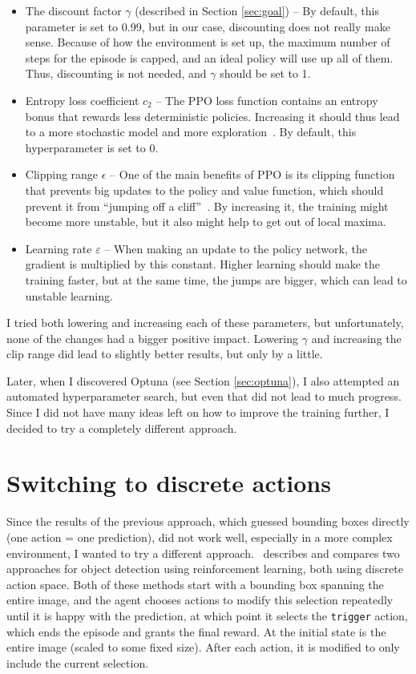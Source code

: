 \documentclass[
  digital,     %
  oneside,     %
  nosansbold,  %
  nocolorbold, %
  lof,         %
  lot,         %
]{fithesis4}
\begin{document}
\begin{itemize}
    \item The discount factor $\gamma$ (described in Section \ref{sec:goal}) -- By default, this parameter is set to 0.99, but in our case, discounting does not really make sense. Because of how the environment is set up, the maximum number of steps for the episode is capped, and an ideal policy will use up all of them. Thus, discounting is not needed, and $\gamma$ should be set to 1.
    \item Entropy loss coefficient $c_2$ -- The PPO loss function contains an entropy bonus that rewards less deterministic policies. Increasing it should thus lead to a more stochastic model and more exploration~\cite{PPO_paper}. By default, this hyperparameter is set to 0.
    \item Clipping range $\epsilon$ -- One of the main benefits of PPO is its clipping function that prevents big updates to the policy and value function, which should prevent it from \enquote{jumping off a cliff}~\cite{PPO_paper}. By increasing it, the training might become more unstable, but it also might help to get out of local maxima.
    \item Learning rate $\varepsilon$ -- When making an update to the policy network, the gradient is multiplied by this constant. Higher learning should make the training faster, but at the same time, the jumps are bigger, which can lead to unstable learning.
\end{itemize}

I tried both lowering and increasing each of these parameters, but unfortunately, none of the changes had a bigger positive impact. Lowering $\gamma$ and increasing the clip range did lead to slightly better results, but only by a little.

Later, when I discovered Optuna (see Section \ref{sec:optuna}), I also attempted an automated hyperparameter search, but even that did not lead to much progress. Since I did not have many ideas left on how to improve the training further, I decided to try a completely different approach.

\section{Switching to discrete actions}
\label{sec:iterative}

Since the results of the previous approach, which guessed bounding boxes directly (one action = one prediction), did not work well, especially in a more complex environment, I wanted to try a different approach. \cite{rl_object_detection}~describes and compares two approaches for object detection using reinforcement learning, both using discrete action space. Both of these methods start with a bounding box spanning the entire image, and the agent chooses actions to modify this selection repeatedly until it is happy with the prediction, at which point it selects the \texttt{trigger} action, which ends the episode and grants the final reward. At the initial state is the entire image (scaled to some fixed size). After each action, it is modified to only include the current selection.
\end{document}
